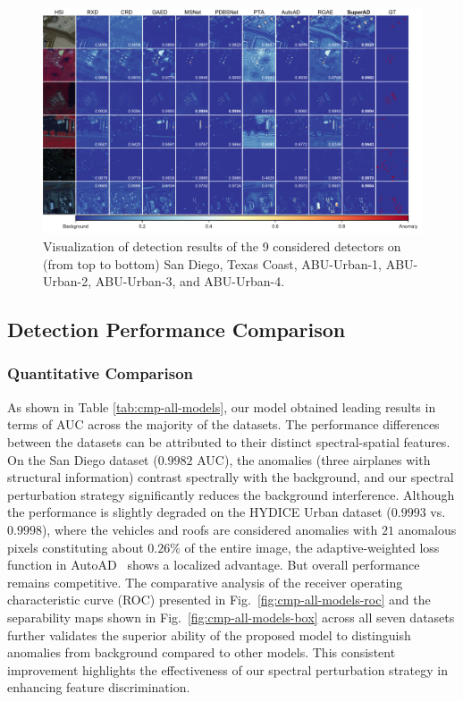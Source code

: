 \begin{figure}[htbp]
  \centering
  \includegraphics[width=1\linewidth]{Figures/PDF/cmp_all.pdf}
  \caption{Visualization of detection results of the 9 considered detectors on (from top to bottom) San Diego, Texas Coast, ABU-Urban-1, ABU-Urban-2, ABU-Urban-3, and ABU-Urban-4. }
  \label{fig:cmp-all-models}
\end{figure}



\subsection{Detection Performance Comparison}



\subsubsection{Quantitative Comparison}
As shown in Table \ref{tab:cmp-all-models}, our model obtained leading results in terms of AUC across the majority of the datasets. The performance differences between the datasets can be attributed to their distinct spectral-spatial features. On the San Diego dataset ($0.9982$ AUC), the anomalies (three airplanes with structural information) contrast spectrally with the background, and our spectral perturbation strategy significantly reduces the background interference. Although the performance is slightly degraded on the HYDICE Urban dataset ($0.9993$ vs. $0.9998$), where the vehicles and roofs are considered anomalies with $21$ anomalous pixels constituting about $0.26$\% of the entire image, the adaptive-weighted loss function in AutoAD~\cite{AutoAD} shows a localized advantage. But overall performance remains competitive. The comparative analysis of the receiver operating characteristic curve (ROC) presented in Fig.~\ref{fig:cmp-all-models-roc} and the separability maps shown in Fig.~\ref{fig:cmp-all-models-box} across all seven datasets further validates the superior ability of the proposed model to distinguish anomalies from background compared to other models. This consistent improvement highlights the effectiveness of our spectral perturbation strategy in enhancing feature discrimination.            

